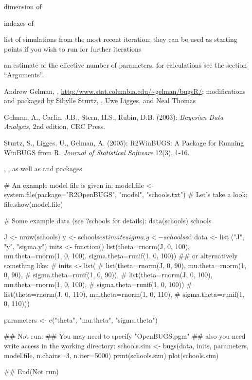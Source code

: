 \begin{Value}
\begin{ldescription}
\item[\code{dimension.short}] dimension of 
\item[\code{indexes.short}] indexes of 
\item[\code{last.values}] list of simulations from the most recent
iteration; they can be used as starting points if you wish to run
 for further iterations
\item[\code{pD}] an estimate of the effective number of parameters, for
calculations see the section ``Arguments''.
\item[\code{DIC}] 
\end{ldescription}
\end{Value}
%
\begin{Author}\relax
Andrew Gelman, ,
\url{http:/www.stat.columbia.edu/~gelman/bugsR/}; modifications and
packaged by Sibylle Sturtz, ,
Uwe Ligges, and Neal Thomas
\end{Author}
%
\begin{References}\relax
Gelman, A., Carlin, J.B., Stern, H.S., Rubin, D.B. (2003):
\emph{Bayesian Data Analysis}, 2nd edition, CRC Press.

Sturtz, S., Ligges, U., Gelman, A. (2005):
R2WinBUGS: A Package for Running WinBUGS from R.
\emph{Journal of Statistical Software} 12(3), 1-16.
\end{References}
%
\begin{SeeAlso}\relax
{}, , as well as
 and  packages
\end{SeeAlso}
%
\begin{Examples}
\begin{ExampleCode}
# An example model file is given in:
model.file <- system.file(package="R2OpenBUGS", "model", "schools.txt")
# Let's take a look:
file.show(model.file)

# Some example data (see ?schools for details):
data(schools)
schools

J <- nrow(schools)
y <- schools$estimate
sigma.y <- schools$sd
data <- list ("J", "y", "sigma.y")
inits <- function(){
    list(theta=rnorm(J, 0, 100), mu.theta=rnorm(1, 0, 100),
         sigma.theta=runif(1, 0, 100))
}
## or alternatively something like:
# inits <- list(
#   list(theta=rnorm(J, 0, 90), mu.theta=rnorm(1, 0, 90),
#        sigma.theta=runif(1, 0, 90)),
#   list(theta=rnorm(J, 0, 100), mu.theta=rnorm(1, 0, 100),
#        sigma.theta=runif(1, 0, 100))
#   list(theta=rnorm(J, 0, 110), mu.theta=rnorm(1, 0, 110),
#        sigma.theta=runif(1, 0, 110)))

parameters <- c("theta", "mu.theta", "sigma.theta")

## Not run:
## You may need to specify "OpenBUGS.pgm"
## also you need write access in the working directory:
schools.sim <- bugs(data, inits, parameters, model.file,
    n.chains=3, n.iter=5000)
print(schools.sim)
plot(schools.sim)

## End(Not run)
\end{ExampleCode}
\end{Examples}
